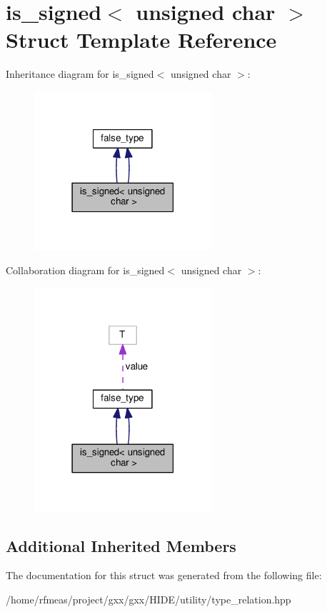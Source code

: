 \hypertarget{structis__signed_3_01unsigned_01char_01_4}{}\section{is\+\_\+signed$<$ unsigned char $>$ Struct Template Reference}
\label{structis__signed_3_01unsigned_01char_01_4}


Inheritance diagram for is\+\_\+signed$<$ unsigned char $>$\+:
\nopagebreak
\begin{figure}[H]
\begin{center}
\leavevmode
\includegraphics[width=186pt]{structis__signed_3_01unsigned_01char_01_4__inherit__graph}
\end{center}
\end{figure}


Collaboration diagram for is\+\_\+signed$<$ unsigned char $>$\+:
\nopagebreak
\begin{figure}[H]
\begin{center}
\leavevmode
\includegraphics[width=186pt]{structis__signed_3_01unsigned_01char_01_4__coll__graph}
\end{center}
\end{figure}
\subsection*{Additional Inherited Members}


The documentation for this struct was generated from the following file\+:\begin{DoxyCompactItemize}
\item 
/home/rfmeas/project/gxx/gxx/\+H\+I\+D\+E/utility/type\+\_\+relation.\+hpp\end{DoxyCompactItemize}
